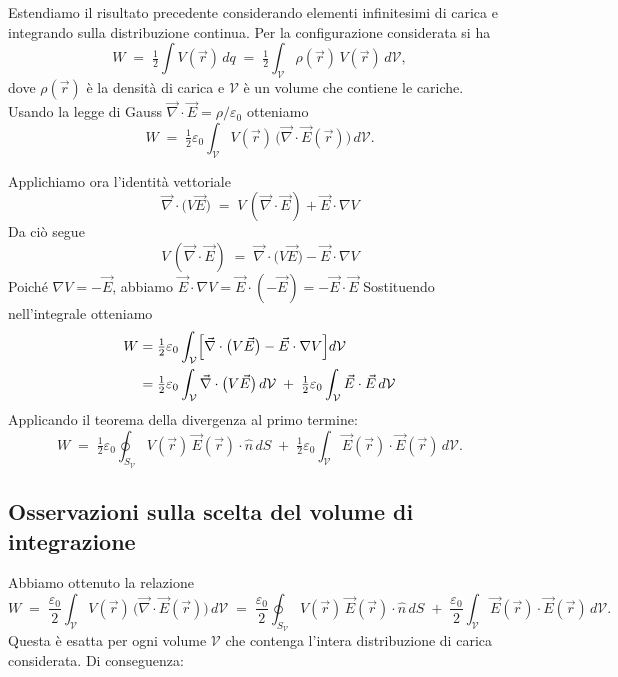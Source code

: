 \documentclass{book}
\begin{document}
Estendiamo il risultato precedente considerando elementi infinitesimi di carica e integrando sulla distribuzione continua. Per la configurazione considerata si ha
\[
W \;=\; \tfrac{1}{2}\int V(\vec r)\,dq
\;=\; \tfrac{1}{2}\int_{\mathcal V} \rho(\vec r)\,V(\vec r)\,d \mathcal{V},
\]
dove \(\rho(\vec r)\) è la densità di carica e \(\mathcal V\) è un volume che contiene le cariche. Usando la legge di Gauss \(\vec{\nabla}\cdot\vec E=\rho/\varepsilon_0\) otteniamo
\[
W \;=\; \tfrac{1}{2}\varepsilon_0 \int_{\mathcal V} V(\vec r)\,\bigl(\vec{\nabla}\cdot\vec E(\vec r)\bigr)\,d\mathcal{V}.
\]

Applichiamo ora l'identità vettoriale
\[
\vec{\nabla}\cdot\bigl(V\vec E\bigr) \;=\; V\,(\vec{\nabla}\cdot\vec E) + \vec E\cdot\nabla V
\]
Da ciò segue
\[
V\,(\vec{\nabla}\cdot\vec E) \;=\; \vec{\nabla}\cdot\bigl(V\vec E\bigr) - \vec E\cdot\nabla V
\]
Poiché \(\nabla V = -\vec E\), abbiamo \(\vec E\cdot \nabla V = \vec E\cdot(-\vec E) = -\vec E\cdot\vec E\) Sostituendo nell'integrale otteniamo
\[
\begin{aligned}
W
&= \tfrac{1}{2}\varepsilon_0 \int_{\mathcal V} \Bigl[ \vec{\nabla}\cdot\bigl(V\vec E\bigr) - \vec E\cdot\nabla V \Bigr] d\mathcal{V} \\
&= \tfrac{1}{2}\varepsilon_0 \int_{\mathcal V} \vec{\nabla}\cdot\bigl(V\vec E\bigr)\,d\mathcal{V} \;+\; \tfrac{1}{2}\varepsilon_0 \int_{\mathcal V} \vec E\cdot\vec E\,d\mathcal{V}
\end{aligned}
\]
Applicando il teorema della divergenza al primo termine:
\[
W \;=\; \tfrac{1}{2}\varepsilon_0 \oint_{S_{\mathcal V}} V(\vec r)\,\vec E(\vec r)\cdot\hat n\,dS
\;+\; \tfrac{1}{2}\varepsilon_0 \int_{\mathcal V} \vec E(\vec r)\cdot\vec E(\vec r)\,d\mathcal{V}.
\]



\subsection*{Osservazioni sulla scelta del volume di integrazione}

Abbiamo ottenuto la relazione
\[
W \;=\; \frac{\varepsilon_0}{2}\int_{\mathcal V} V(\vec r)\,\bigl(\vec{\nabla}\cdot\vec E(\vec r)\bigr)\,d\mathcal V
\;=\; \frac{\varepsilon_0}{2}\oint_{S_{\mathcal V}} V(\vec r)\,\vec E(\vec r)\cdot\hat n\,dS
\;+\; \frac{\varepsilon_0}{2}\int_{\mathcal V} \vec E(\vec r)\cdot\vec E(\vec r)\,d\mathcal V.
\]
Questa è esatta per ogni volume \(\mathcal V\) che contenga l'intera distribuzione di carica considerata. Di conseguenza:
\end{document}
